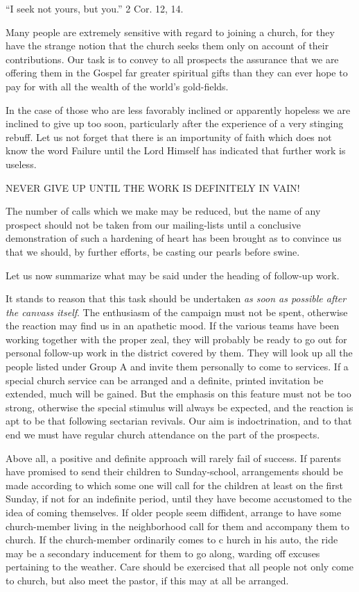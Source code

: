 \documentclass[
]{book}
\begin{document}
``I seek not yours, but you.'' 2 Cor. 12, 14.

Many people are extremely sensitive with regard to joining a church, for they have the strange notion that the church seeks them only on account of their contributions. Our task is to convey to all prospects the assurance that we are offering them in the Gospel far greater spiritual gifts than they can ever hope to pay for with all the wealth of the world's gold-fields.

In the case of those who are less favorably inclined or apparently hopeless we are inclined to give up too soon, particularly after the experience of a very stinging rebuff. Let us not forget that there is an importunity of faith which does not know the word Failure until the Lord Himself has indicated that further work is useless.

NEVER GIVE UP UNTIL THE WORK IS DEFINITELY IN VAIN!

The number of calls which we make may be reduced, but the name of any prospect should not be taken from our mailing-lists until a conclusive demonstration of such a hardening of heart has been brought as to convince us that we should, by further efforts, be casting our pearls before swine.

Let us now summarize what may be said under the heading of follow-up work.

It stands to reason that this task should be undertaken \emph{as soon as possible after the canvass itself}. The enthusiasm of the campaign must not be spent, otherwise the reaction may find us in an apathetic mood. If the various teams have been working together with the proper zeal, they will probably be ready to go out for personal follow-up work in the district covered by them. They will look up all the people listed under Group A and invite them personally to come to services. If a special church service can be arranged and a definite, printed invitation be extended, much will be gained. But the emphasis on this feature must not be too strong, otherwise the special stimulus will always be expected, and the reaction is apt to be that following sectarian revivals. Our aim is indoctrination, and to that end we must have regular church attendance on the part of the prospects.

Above all, a positive and definite approach will rarely fail of success. If parents have promised to send their children to Sunday-school, arrangements should be made according to which some one will call for the children at least on the first Sunday, if not for an indefinite period, until they have become accustomed to the idea of coming themselves. If older people seem diffident, arrange to have some church-member living in the neighborhood call for them and accompany them to church. If the church-member ordinarily comes to c hurch in his auto, the ride may be a secondary inducement for them to go along, warding off excuses pertaining to the weather. Care should be exercised that all people not only come to church, but also meet the pastor, if this may at all be arranged.
\end{document}
